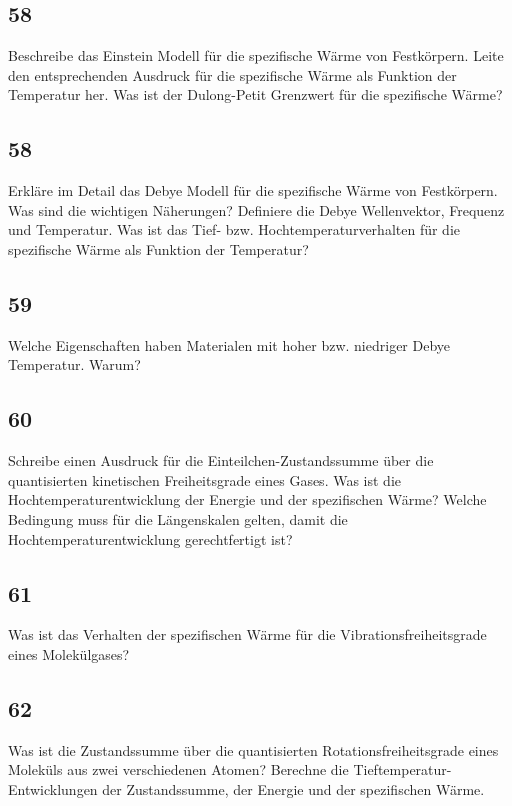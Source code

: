 \documentclass[12pt,a4paper]{report}
\newenvironment{myfrag}{\begin{it}}{\end{it}\vspace{3mm}\par}
\numberwithin{equation}{section}
\begin{document}
\subsection{58}
\begin{myfrag}
Beschreibe das Einstein Modell für die spezifische Wärme von Festkörpern.
Leite den entsprechenden Ausdruck für die spezifische Wärme als Funktion
der Temperatur her. Was ist der Dulong-Petit Grenzwert für die spezifische
Wärme?
\end{myfrag}
\subsection{58}
\begin{myfrag}
Erkläre im Detail das Debye Modell für die spezifische Wärme von
Festkörpern. Was sind die wichtigen Näherungen? Definiere die Debye
Wellenvektor, Frequenz und Temperatur. Was ist das Tief- bzw.
Hochtemperaturverhalten für die spezifische Wärme als Funktion der
Temperatur?
\end{myfrag}
\subsection{59}
\begin{myfrag}
Welche Eigenschaften haben Materialen mit hoher bzw. niedriger Debye
Temperatur. Warum?
\end{myfrag}
\subsection{60}
\begin{myfrag}
Schreibe einen Ausdruck für die Einteilchen-Zustandssumme über die
quantisierten kinetischen Freiheitsgrade eines Gases. Was ist die
Hochtemperaturentwicklung der Energie und der spezifischen Wärme?
Welche Bedingung muss für die Längenskalen gelten, damit die
Hochtemperaturentwicklung gerechtfertigt ist?
\end{myfrag}
\subsection{61}
\begin{myfrag}
Was ist das Verhalten der spezifischen Wärme für die Vibrationsfreiheitsgrade
eines Molekülgases?
\end{myfrag}
\subsection{62}
\begin{myfrag}
Was ist die Zustandssumme über die quantisierten Rotationsfreiheitsgrade
eines Moleküls aus zwei verschiedenen Atomen? Berechne die
Tieftemperatur-Entwicklungen der Zustandssumme, der Energie und der
spezifischen Wärme.
\end{myfrag}
\end{document}
